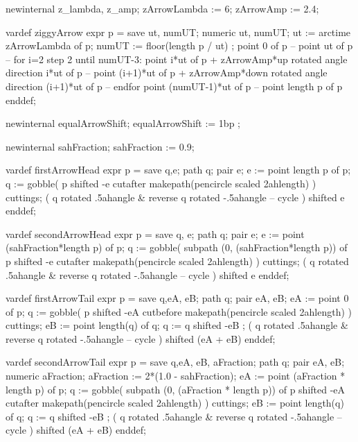  newinternal z_lambda, z_amp;
  zArrowLambda := 6;   %
  zArrowAmp    := 2.4; %

  vardef ziggyArrow expr p = 
    save ut, numUT; numeric ut, numUT;    
    ut    := arctime zArrowLambda of p;
    numUT := floor(length p / ut) ;
    point 0 of p -- point ut of p --
      for i=2 step 2 until numUT-3:
        point     i*ut of p +
          zArrowAmp*up   rotated angle direction     i*ut of p --
        point (i+1)*ut of p +
          zArrowAmp*down rotated angle direction (i+1)*ut of p --
      endfor
    point (numUT-1)*ut of p -- point length p of p
  enddef;
  
  newinternal equalArrowShift;
  equalArrowShift := 1bp ;
    

  newinternal sahFraction;
  sahFraction := 0.9; 
  
  
  vardef firstArrowHead expr p =
    save q,e; path q; pair e;
    e := point length p of p;
    q := gobble(
      p shifted -e 
      cutafter makepath(pencircle scaled 2ahlength)
    ) cuttings;
    (
      q rotated .5ahangle &
      reverse q rotated -.5ahangle --
      cycle
    )  shifted e
  enddef;
  
  vardef secondArrowHead expr p =
    save q, e; path q; pair e;
    e := point (sahFraction*length p) of p;
    q := gobble(
      subpath (0, (sahFraction*length p)) of p shifted -e 
      cutafter makepath(pencircle scaled 2ahlength)
    ) cuttings;
    (
      q rotated .5ahangle &
      reverse q rotated -.5ahangle --
      cycle
    )  shifted e
  enddef;
  
  vardef firstArrowTail expr p =
    save q,eA, eB; path q; pair eA, eB;
    eA := point 0 of p;
    q := gobble(
      p shifted -eA
      cutbefore makepath(pencircle scaled 2ahlength)
    ) cuttings;
    eB := point length(q) of q;
    q := q shifted -eB ;
    (
      q rotated .5ahangle &
      reverse q rotated -.5ahangle --
      cycle
    ) shifted (eA + eB)
  enddef;
  
  vardef secondArrowTail expr p =
    save q,eA, eB, aFraction; path q;
    pair eA, eB; numeric aFraction;
    aFraction := 2*(1.0 - sahFraction);
    eA := point (aFraction * length p) of p;
    q := gobble(
      subpath (0, (aFraction * length p)) of p shifted -eA
      cutafter makepath(pencircle scaled 2ahlength)
    ) cuttings;
    eB := point length(q) of q;
    q := q shifted -eB ;
    (
      q rotated .5ahangle &
      reverse q rotated -.5ahangle --
      cycle
    ) shifted (eA + eB)
  enddef;


